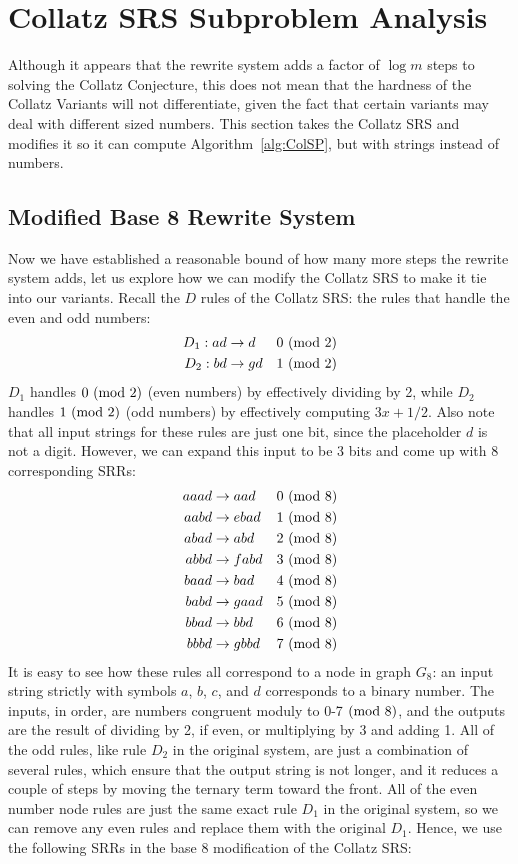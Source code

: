 \section{Collatz SRS Subproblem Analysis} \label{subsec:collatzsubproblemananalysis}
Although it appears that the rewrite system adds a factor of $\log{m}$ steps to solving the Collatz Conjecture, this does not mean that the hardness of the Collatz Variants will not differentiate, given the fact that certain variants may deal with different sized numbers. This section takes the Collatz SRS and modifies it so it can compute Algorithm~\ref{alg:ColSP}, but with strings instead of numbers.
\subsection{Modified Base 8 Rewrite System} \label{subsec:base8rewrite}
Now we have established a reasonable bound of how many more steps the rewrite system adds, let us explore how we can modify the Collatz SRS to make it tie into our variants. Recall the $D$ rules of the Collatz SRS: the rules that handle the even and odd numbers:
\begin{align*}
    D_1: ad &\rightarrow d &\text{$0\ (\mathrm{mod}\ 2)$}\\
    D_2: bd &\rightarrow gd &\text{$1\ (\mathrm{mod}\ 2)$}\\
\end{align*}
$D_1$ handles $0 \ (\mathrm{mod}\ 2)$ (even numbers) by effectively dividing by 2, while $D_2$ handles $1 \ (\mathrm{mod}\ 2)$ (odd numbers)  by effectively computing $3x+1/2$. Also note that all input strings for these rules are just one bit, since the placeholder $d$ is not a digit. However, we can expand this input to be 3 bits and come up with 8 corresponding SRRs:
\begin{align*}
    aaad &\rightarrow aad &\text{$0\ (\mathrm{mod}\ 8)$}\\
    aabd &\rightarrow ebad &\text{$1\ (\mathrm{mod}\ 8)$}\\
    abad &\rightarrow abd &\text{$2\ (\mathrm{mod}\ 8)$}\\
    abbd &\rightarrow fabd &\text{$3\ (\mathrm{mod}\ 8)$}\\
    baad &\rightarrow bad &\text{$4\ (\mathrm{mod}\ 8)$}\\
    babd &\rightarrow gaad &\text{$5\ (\mathrm{mod}\ 8)$}\\
    bbad &\rightarrow bbd &\text{$6\ (\mathrm{mod}\ 8)$}\\
    bbbd &\rightarrow gbbd &\text{$7\ (\mathrm{mod}\ 8)$}
\end{align*}
It is easy to see how these rules all correspond to a node in graph $G_8$: an input string strictly with symbols $a$, $b$, $c$, and $d$ corresponds to a binary number. The inputs, in order, are numbers congruent moduly to 0-7$\ (\mathrm{mod}\ 8)$, and the outputs are the result of dividing by 2, if even, or multiplying by 3 and adding 1. All of the odd rules, like rule $D_2$ in the original system, are just a combination of several rules, which ensure that the output string is not longer, and it reduces a couple of steps by moving the ternary term toward the front. All of the even number node rules are just the same exact rule $D_1$ in the original system, so we can remove any even rules and replace them with the original $D_1$. Hence, we use the following SRRs in the base 8 modification of the Collatz SRS:
